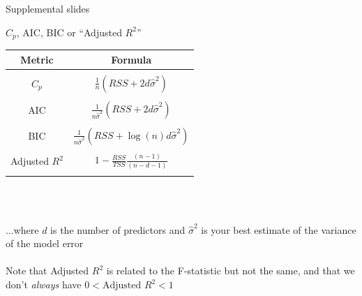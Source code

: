 \documentclass[mathserif, aspectratio=169]{beamer}
\begin{document}
\begin{frame}{Supplemental slides}

\end{frame}


\begin{frame}{$C_p$, AIC, BIC or ``Adjusted $R^2$''}

\begin{center}
\begin{tabular}{cc}
Metric & Formula\\
\hline\hline\\
$C_p$ & $\frac{1}{n}\left(RSS + 2d\hat{\sigma}^2\right)$\\\\
AIC & $\frac{1}{n\hat{\sigma}^2}\left(RSS + 2d\hat{\sigma}^2\right)$\\\\
BIC & $\frac{1}{n\hat{\sigma}^2}\left(RSS + \log{(n)}d\hat{\sigma}^2\right)$\\\\
Adjusted $R^2$ & $1-\frac{RSS}{TSS}\frac{(n-1)}{(n-d-1)}$\\\\
\hline
\end{tabular}\\~\\
\end{center}

...where $d$ is the number of predictors and $\hat{\sigma}^2$ is your best estimate of the variance of the model error\\~\\

Note that Adjusted $R^2$ is related to the F-statistic but not the same, and that we don't \textit{always} have $0<\text{Adjusted }R^2<1$

\end{frame}
\end{document}
